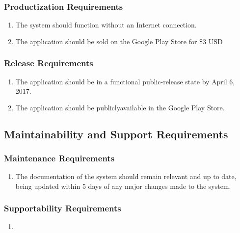 \documentclass[]{article}
\begin{document}
\subsubsection{Productization Requirements}
\label{ssub:productization_requirements}
\begin{enumerate}[{OE}1. ]
	\item The system should function without an Internet connection.
	\item The application should be sold on the Google Play Store for \$3 USD
\end{enumerate}

\subsubsection{Release Requirements}
\label{ssub:release_requirements}
\begin{enumerate}[{OE}1. ]
	\item The application should be in a functional public-release state by April 6, 2017.
	\item The application should be publicly\-available in the Google Play Store.
\end{enumerate}


\subsection{Maintainability and Support Requirements}
\label{sub:maintainability_and_support_requirements}

\subsubsection{Maintenance Requirements}
\label{ssub:maintenance_requirements}
\begin{enumerate}[{MS}1. ]
	\item The documentation of the system should remain relevant and up to date, being updated within 5 days of any major changes made to the system.
\end{enumerate}

\subsubsection{Supportability Requirements}
\label{ssub:supportability_requirements}
\begin{enumerate}[{MS}1. ]
	\item 
\end{enumerate}
\end{document}
